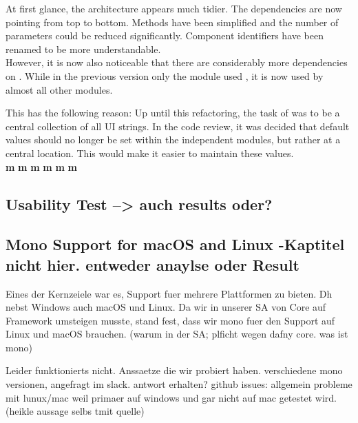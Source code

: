 At first glance, the architecture appears much tidier.
The dependencies are now pointing from top to bottom.
Methods have been simplified and the number of parameters could be reduced significantly.
Component identifiers have been renamed to be more understandable. \\

However, it is now also noticeable that there are considerably more dependencies on .
While in the previous version only the module  used , it is now used by almost all other modules.

This has the following reason: Up until this refactoring, the task of  was to be a central collection of all UI strings. 
In the code review, it was decided that default values should no longer be set within the independent modules,
but rather at a central location.
This would make it easier to maintain these values. \\



\textbf{m}
\textbf{m}
\textbf{m}
\textbf{m}
\textbf{m}
\textbf{m}



\subsection{Usability Test --> auch results oder?}


\subsection{Mono Support for macOS and Linux -Kaptitel nicht hier. entweder anaylse oder Result}
Eines der Kernzeiele war es, Support fuer mehrere Plattformen zu bieten. Dh nebst Windows auch macOS und Linux.
Da wir in unserer SA von Core auf Framework umsteigen musste, stand fest, dass wir mono fuer den Support auf Linux und macOS brauchen.
(warum in der SA; plficht wegen dafny core. was ist mono)

Leider funktionierts nicht.
Anssaetze die wir probiert haben. verschiedene mono versionen, angefragt im slack. antwort erhalten?
github issues: allgemein probleme mit lunux/mac weil primaer auf windows und gar nicht auf mac getestet wird. (heikle aussage selbs tmit quelle)

\cite{sa}
\cite{mono-slack}
\cite{mono-git}
